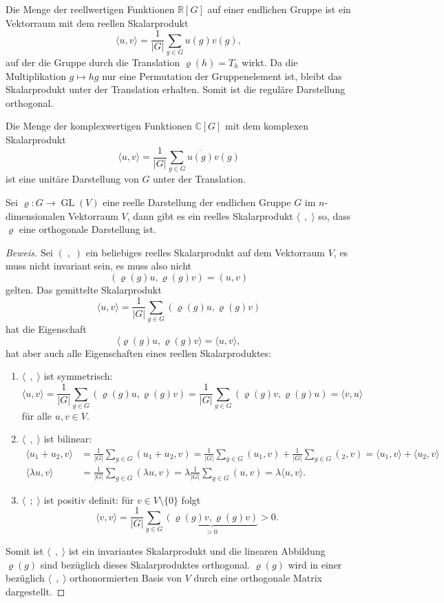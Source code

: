 \begin{beispiel}
Die Menge der reellwertigen Funktionen $\mathbb{R}[G]$ auf einer endlichen
Gruppe ist ein Vektorraum mit dem reellen Skalarprodukt
\[
\langle u,v\rangle
=
\frac{1}{|G|}
\sum_{g\in G} u(g)v(g),
\]
auf der die Gruppe durch die Translation $\varrho(h)=T_h$ wirkt.
Da die Multiplikation $g\mapsto hg$ nur eine Permutation der Gruppenelement
ist, bleibt das Skalarprodukt unter der Translation erhalten.
Somit ist die reguläre Darstellung orthogonal.

Die Menge der komplexwertigen Funktionen $\mathbb{C}[G]$ mit dem
komplexen Skalarprodukt 
\[
\langle u,v\rangle
=
\frac{1}{|G|}
\sum_{g\in G} \overline{u(g)} v(g)
\]
ist eine unitäre Darstellung von $G$ unter der Translation.
\end{beispiel}

\begin{satz}
Sei $\varrho\colon G\to\operatorname{GL}(V)$ eine reelle Darstellung
der endlichen Gruppe $G$ im $n$-dimensionalen Vektorraum $V$, dann gibt
es ein reelles Skalarprodukt $\langle \;\,,\;\rangle$ so, dass
$\varrho$ eine orthogonale Darstellung ist.
\end{satz}

\begin{proof}[Beweis]
Sei $(\;,\;)$ ein beliebiges reelles Skalarprodukt auf dem Vektorraum $V$,
es muss nicht invariant sein, es muss also nicht
\[
(\varrho(g)u,\varrho(g)v)
=
(u,v)
\]
gelten.
Das gemittelte Skalarprodukt
\[
\langle u,v\rangle
=
\frac{1}{|G|}
\sum_{g\in G}
(\varrho(g)u,\varrho(g)v)
\]
hat die Eigenschaft
\[
\langle \varrho(g)u,\varrho(g)v\rangle
=
\langle u,v\rangle,
\]
hat aber auch alle Eigenschaften eines reellen Skalarproduktes:
\begin{enumerate}
\item $\langle\;\,,\;\rangle$ ist symmetrisch:
\[
\langle u,v\rangle
=
\frac{1}{|G|} \sum_{g\in G} (\varrho(g)u,\varrho(g)v)
=
\frac{1}{|G|} \sum_{g\in G} (\varrho(g)v,\varrho(g)u)
=
\langle v,u\rangle
\]
für alle $u,v\in V$.
\item $\langle\;\,,\;\rangle$ ist bilinear:
\begin{align*}
\langle u_1+u_2,v\rangle
&=
\frac{1}{|G|} \sum_{g\in G} (u_1+u_2,v)
=
\frac{1}{|G|} \sum_{g\in G} (u_1,v)
+
\frac{1}{|G|} \sum_{g\in G} (_2,v)
=
\langle u_1,v\rangle + \langle u_2,v\rangle
\\
\langle \lambda u,v\rangle
&=
\frac{1}{|G|} \sum_{g\in G} (\lambda u,v)
=
\lambda
\frac{1}{|G|} \sum_{g\in G} (u,v)
=
\lambda \langle u,v\rangle.
\end{align*}
\item $\langle \;\,;\;\rangle$ ist positiv definit: für $v\in V\setminus\{0\}$
folgt
\[
\langle v,v\rangle
=
\frac{1}{|G|} \sum_{g\in G}
\underbrace{(\varrho(g)v,\varrho(g)v)}_{\displaystyle > 0}
>
0.
\]
\end{enumerate}
Somit ist $\langle\;\,,\;\rangle$ ist ein invariantes Skalarprodukt und
die linearen Abbildung $\varrho(g)$ sind bezüglich dieses Skalarproduktes
orthogonal.
$\varrho(g)$ wird in einer bezüglich $\langle\;\,,\;\rangle$
orthonormierten Basis von $V$ durch eine orthogonale Matrix dargestellt.
\end{proof}

